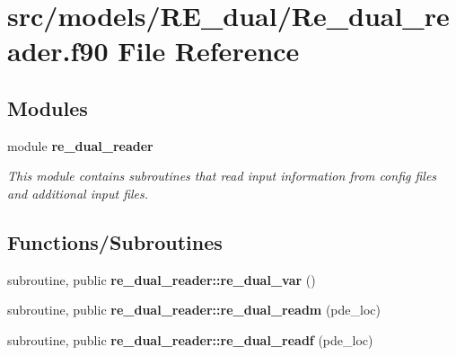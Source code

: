 \section{src/models/\+R\+E\+\_\+dual/\+Re\+\_\+dual\+\_\+reader.f90 File Reference}
\label{_re__dual__reader_8f90}
\subsection*{Modules}
\begin{DoxyCompactItemize}
\item 
module {\bf re\+\_\+dual\+\_\+reader}
\begin{DoxyCompactList}\small\item\em This module contains subroutines that read input information from config files and additional input files. \end{DoxyCompactList}\end{DoxyCompactItemize}
\subsection*{Functions/\+Subroutines}
\begin{DoxyCompactItemize}
\item 
subroutine, public {\bf re\+\_\+dual\+\_\+reader\+::re\+\_\+dual\+\_\+var} ()
\item 
subroutine, public {\bf re\+\_\+dual\+\_\+reader\+::re\+\_\+dual\+\_\+readm} (pde\+\_\+loc)
\item 
subroutine, public {\bf re\+\_\+dual\+\_\+reader\+::re\+\_\+dual\+\_\+readf} (pde\+\_\+loc)
\end{DoxyCompactItemize}
